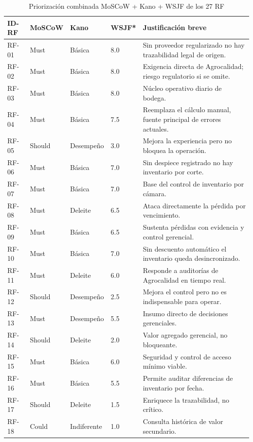 \documentclass[11pt,a4paper]{article}
\begin{document}
\begin{longtable}{|p{1.3cm}|p{1.8cm}|p{2.2cm}|p{1.6cm}|p{7.5cm}|}
\caption{Priorización combinada MoSCoW + Kano + WSJF de los 27 RF}\\
\hline
\textbf{ID-RF} & \textbf{MoSCoW} & \textbf{Kano} & \textbf{WSJF*} & \textbf{Justificación breve} \\
\hline
RF-01 & Must & Básica & 8.0 & Sin proveedor regularizado no hay trazabilidad legal de origen. \\
RF-02 & Must & Básica & 8.0 & Exigencia directa de Agrocalidad; riesgo regulatorio si se omite. \\
RF-03 & Must & Básica & 8.0 & Núcleo operativo diario de bodega. \\
RF-04 & Must & Básica & 7.5 & Reemplaza el cálculo manual, fuente principal de errores actuales. \\
RF-05 & Should & Desempeño & 3.0 & Mejora la experiencia pero no bloquea la operación. \\
RF-06 & Must & Básica & 7.0 & Sin despiece registrado no hay inventario por corte. \\
RF-07 & Must & Básica & 7.0 & Base del control de inventario por cámara. \\
RF-08 & Must & Deleite & 6.5 & Ataca directamente la pérdida por vencimiento. \\
RF-09 & Must & Básica & 6.5 & Sustenta pérdidas con evidencia y control gerencial. \\
RF-10 & Must & Básica & 7.0 & Sin descuento automático el inventario queda desincronizado. \\
RF-11 & Must & Deleite & 6.0 & Responde a auditorías de Agrocalidad en tiempo real. \\
RF-12 & Should & Desempeño & 2.5 & Mejora el control pero no es indispensable para operar. \\
RF-13 & Must & Desempeño & 5.5 & Insumo directo de decisiones gerenciales. \\
RF-14 & Should & Deleite & 2.0 & Valor agregado gerencial, no bloqueante. \\
RF-15 & Must & Básica & 6.0 & Seguridad y control de acceso mínimo viable. \\
RF-16 & Must & Básica & 5.5 & Permite auditar diferencias de inventario por fecha. \\
RF-17 & Should & Deleite & 1.5 & Enriquece la trazabilidad, no crítico. \\
RF-18 & Could & Indiferente & 1.0 & Consulta histórica de valor secundario. \\

\end{longtable}
\end{document}
